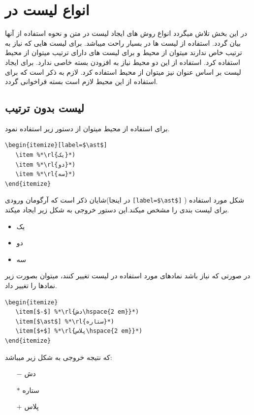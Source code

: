\section{انواع لیست در }
در این بخش تلاش میگردد  انواع روش های ایجاد لیست در متن و نحوه استفاده از آنها بیان گردد. استفاده از لیست ها در 
\lr{\LaTeX}
بسیار راحت میباشد.   برای لیست هایی که نیاز به ترتیب خاص ندارند میتوان از محیط 
 و برای لیست های دارای ترتیب  میتوان از محیط
استفاده کرد. استفاده از این دو محیط نیاز به افزودن بسته خاصی ندارد.
 برای ایجاد لیست بر اساس عنوان نیز میتوان از محیط 
استفاده کرد. لازم به ذکر است که برای استفاده از این محیط لازم است بسته
فراخوانی گردد.  


\subsection{لیست بدون ترتیب } 
 برای استفاده از محیط 
 میتوان از دستور زیر استفاده نمود.
\begin{latin}
\begin{lstlisting}[style=Tex]
\begin{itemize}[label=$\ast$]
   \item %*\rl{یک}*)
   \item %*\rl{دو}*)
   \item %*\rl{سه}*)
\end{itemize}
\end{lstlisting}
\end{latin}

شایان ذکر است که آرگومان ورودی(در اینجا 
\verb![label=$\ast$]!
)
 شکل مورد استفاده برای لیست بندی را مشخص میکند.این دستور خروجی به شکل زیر ایجاد میکند.
\begin{itemize}[label=$\ast$]
\item یک
\item دو
\item سه
\end{itemize}
در صورتی که نیاز باشد نمادهای مورد استفاده در لیست تغییر کنند، میتوان بصورت زیر نمادها را تغییر داد.
\begin{latin}
\begin{lstlisting}[style=Tex]
\begin{itemize}
   \item[$-$] %*\rl{دش\hspace{2 em}}*)
   \item[$\ast$] %*\rl{ستاره}*)
   \item[$+$] %*\rl{پلاس\hspace{2 em}}*)
\end{itemize}
\end{lstlisting}
\end{latin}
که نتیجه خروجی به شکل زیر میباشد:
\begin{itemize}
    \item[$-$] دش
    \item[$\ast$] ستاره
    \item[$+$] پلاس
\end{itemize}



